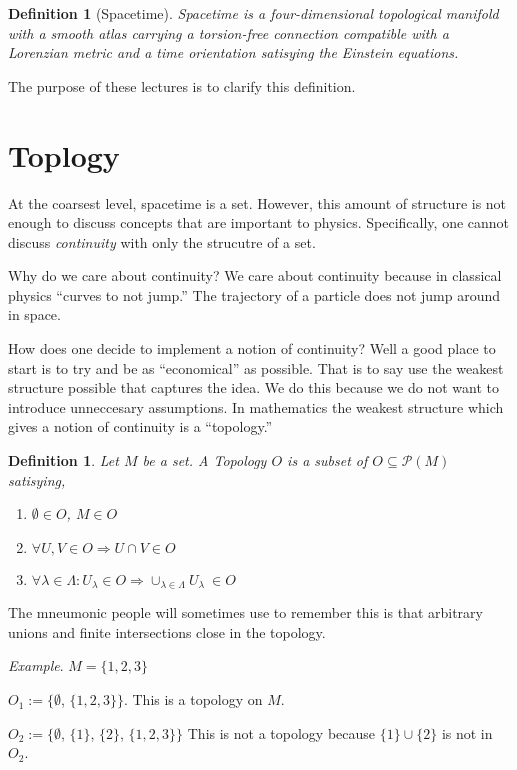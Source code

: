 \documentclass{article}
\newtheorem*{definition_star}{Definition}
\newtheorem{definition}{Definition}
\begin{document}
	\begin{definition_star}[Spacetime]
		Spacetime is a four-dimensional topological manifold with a smooth
		atlas carrying a torsion-free connection compatible with a Lorenzian
		metric and a time orientation satisying the Einstein equations.
	\end{definition_star}
	The purpose of these lectures is to clarify this definition.

	\section{Toplogy}
	\noindent At the coarsest level, spacetime is a set. However, this amount of structure is
	not enough to discuss concepts that are important to physics. Specifically, one
	cannot discuss \textit{continuity} with only the strucutre of a set.

	\noindent Why do we care about continuity? We care about continuity because in classical
	physics ``curves to not jump.'' The trajectory of a particle does not jump around
	in space.

	\noindent How does one decide to implement a notion of continuity? Well a good place to 
	start is to try and be as ``economical'' as possible. That is to say use the
	weakest structure possible that captures the idea. We do this because we do not 
	want to introduce unneccesary assumptions. In mathematics the weakest structure
	which gives a notion of continuity is a ``topology.''

	\begin{definition}
		Let $M$ be a set. A Topology $O$ is a subset of $O \subseteq \mathscr{P}(M)$
		satisying,
		\begin{enumerate}
			\item $\emptyset \in O$, $M\in O$
			\item $\forall U,V\in O \Rightarrow U\cap V\in O$
			\item $\forall \lambda\in\Lambda : U_\lambda\in O\Rightarrow 
			\cup_{\lambda\in\Lambda} U_\lambda \:\in O$
		\end{enumerate}
	\end{definition}
	\noindent The mneumonic people will sometimes use to remember this is that arbitrary unions
	and finite intersections close in the topology.

	\noindent\textit{Example}. $M = \{1,2,3\}$

	\noindent $O_1:=\{\emptyset$, $\{1,2,3\}\}$. This is a topology on $M$.

	\noindent $O_2:=\{\emptyset$, $\{1\}$, $\{2\}$, $\{1,2,3\}\}$ This is not a topology
	because $\{1\}\cup\{2\}$ is not in $O_2$.
	\vspace{0.25cm}	
\end{document}
